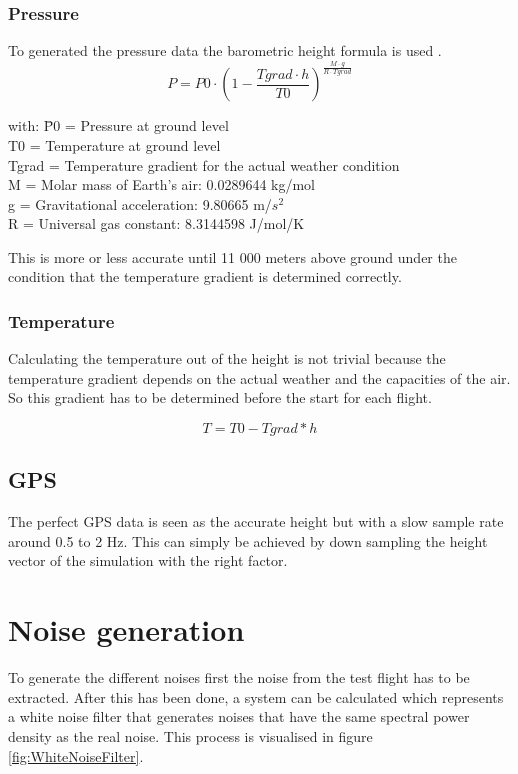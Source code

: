   \subsubsection{Pressure}
  To generated the pressure data the barometric height formula is used \cite{NASAEarthAtmosphereModel2015}.
  $$P = P0 \cdot (1- \frac{Tgrad\cdot h}{T0})^{\frac{M\cdot g}{R\cdot Tgrad}}$$
  \begin{tabbing}
  with: \= P0 = Pressure at ground level \\
  \> T0 = Temperature at ground level \\
  \> Tgrad = Temperature gradient for the actual weather condition \\
  \> M = Molar mass of Earth's air: 0.0289644 kg/mol\\
  \> g = Gravitational acceleration: 9.80665 m/$s^2$\\
  \> R = Universal gas constant: 8.3144598 J/mol/K\\
  \end{tabbing}

  This is more or less accurate until 11 000 meters above ground under the condition that the temperature gradient is determined correctly.

  \subsubsection{Temperature}
  Calculating the temperature out of the height is not trivial because the temperature gradient depends on the actual weather and the capacities of the air.
  So this gradient has to be determined before the start for each flight.

  $$T = T0 - Tgrad*h$$

  \subsection{GPS}
  The perfect GPS data is seen as the accurate height but with a slow sample rate around 0.5 to 2 Hz.
  This can simply be achieved by down sampling the height vector of the simulation with the right factor.

  \section{Noise generation}
  To generate the different noises first the noise from the test flight has to be extracted.
  After this has been done, a system can be calculated which represents a white noise filter that generates noises
  that have the same spectral power density as the real noise. This process is visualised in figure \ref{fig:WhiteNoiseFilter}.


